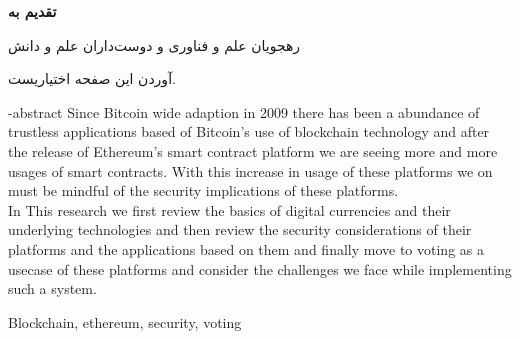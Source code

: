 \documentclass[oneside,openany,mscS]{SBU-Thesis}
\begin{document}
\rightsPage %
\copyRightPage %

{
	\newpage
	\thispagestyle{plain}
	\large{\textbf{تقدیم به}}
	
	\begin{center}
		رهجويان علم و فناوری و دوست‌داران علم و دانش
	\end{center}
	
	\vspace{14cm}	
	آوردن این صفحه اختیاریست.
	
	\pagebreak
}
\tableofcontents %

	
\abstractPage %
		




	

\newpage


\en-abstract
{
	Since Bitcoin wide adaption in 2009 there has been a abundance of trustless applications based of Bitcoin's use of blockchain technology and after the release of Ethereum's smart contract platform we are seeing more and more usages of smart contracts. With this increase in usage of these platforms we on must be mindful of the security implications of these platforms. \\
	In This research we first review the basics of digital currencies and their underlying technologies and then review the security considerations of their platforms and the applications based on them and finally move to voting as a usecase of these platforms and consider the challenges we face while implementing such a system.
}

\latinkeywords
{
	Blockchain, ethereum, security, voting
}

\latinAbstractPage %
\latinFirstPage %

	
\end{document}
